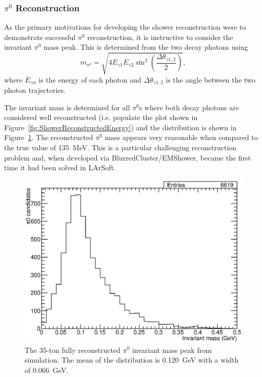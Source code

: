 \subsubsection{$\pi^0$ Reconstruction}\label{sec:pi0Reconstruction}

As the primary motivations for developing the shower reconstruction were to demonstrate successful $\pi^0$ reconstruction, it is instructive to consider the invariant $\pi^0$ mass peak.  This is determined from the two decay photons using
\begin{equation}
  m_{\pi^0} = \sqrt{4 E_{\gamma 1} E_{\gamma 2} \sin^2{\left( \frac{\Delta \theta_{\gamma 1,2}}{2} \right)}},
\end{equation}
where $E_{\gamma n}$ is the energy of each photon and $\Delta \theta_{\gamma 1,2}$ is the angle between the two photon trajectories.

The invariant mass is determined for all $\pi^0$s where both decay photons are considered well reconstructed (i.e. populate the plot shown in Figure~\ref{fig:ShowerReconstructedEnergy}) and the distribution is shown in Figure~\ref{fig:Pi0MassPeak}.  The reconstructed $\pi^0$ mass appears very reasonable when compared to the true value of 135~MeV.  This is a particular challenging reconstruction problem and, when developed via BlurredCluster/EMShower, became the first time it had been solved in LArSoft.

\begin{figure}
  \centering
  \includegraphics[width=12cm]{Pi0MassPeak.eps}
  \caption[The 35-ton fully reconstructed $\pi^0$ invariant mass peak from simulation.]{The 35-ton fully reconstructed $\pi^0$ invariant mass peak from simulation.  The mean of the distribution is 0.120~GeV with a width of 0.066~GeV.}
  \label{fig:Pi0MassPeak}
\end{figure}

